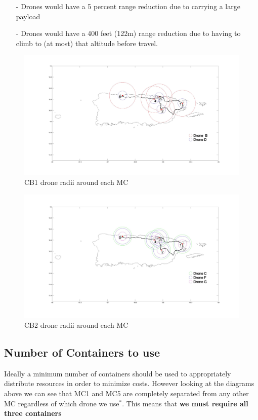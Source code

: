 \documentclass[a4paper,12pt]{article}
\begin{document}
\begin{itemize}
\item[-]Drones would have a 5 percent range reduction due to carrying a large payload
\item[-]Drones would have a 400 feet (122m) range reduction due to having to climb to (at most) that altitude before travel.
\end{itemize}

\begin{figure}[p]
\centering
\includegraphics[scale =0.15]{CB1}
\caption{CB1 drone radii around each MC}
\label{cb1}
\end{figure}

\begin{figure}[p]
\centering
\includegraphics[scale =0.15]{CB2}
\caption{CB2 drone radii around each MC}
\label{cb2}
\end{figure}

\newpage

\subsection{Number of Containers to use}
Ideally a minimum number of containers should be used to appropriately distribute resources in order to minimize costs.
However looking at the diagrams above we can see that MC1 and MC5 are completely separated from any other MC regardless
of which drone we use$^{*}$. This means that \bf{we must require all three containers} 
\end{document}
